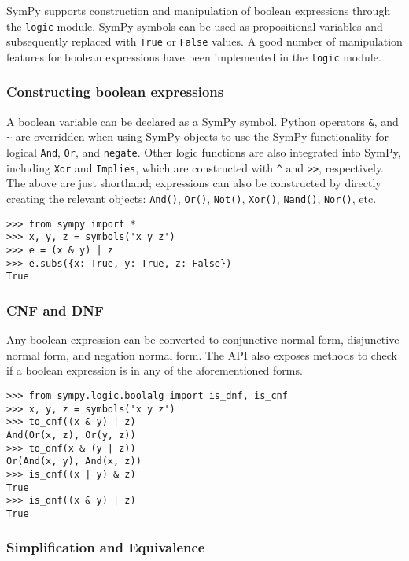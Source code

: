 
SymPy supports construction and manipulation of boolean expressions
through the \texttt{logic} module. SymPy symbols can be used as
propositional variables and subsequently replaced with \texttt{True}
or \texttt{False} values. A good number of manipulation features for boolean
expressions have been implemented in the \texttt{logic} module.

\subsubsection{Constructing boolean expressions}

A boolean variable can be declared as a SymPy symbol. Python operators
\texttt{\&}, \texttt{\textbar{}} and \texttt{\textasciitilde{}} are overridden
when using SymPy objects
to use the SymPy functionality for logical \texttt{And}, \texttt{Or}, and
\texttt{negate}.  Other logic functions are also integrated into SymPy,
including \texttt{Xor} and \texttt{Implies}, which are constructed with
\texttt{\^{}} and \texttt{\textgreater{}\textgreater{}}, respectively.  The above
are just shorthand; expressions can also be constructed by directly creating
the relevant objects: \verb|And()|, \verb|Or()|, \verb|Not()|, \verb|Xor()|,
\verb|Nand()|, \verb|Nor()|, etc.

\begin{verbatim}
>>> from sympy import *
>>> x, y, z = symbols('x y z')
>>> e = (x & y) | z
>>> e.subs({x: True, y: True, z: False})
True
\end{verbatim}

\subsubsection{CNF and DNF}

Any boolean expression can be converted to conjunctive normal form, disjunctive
normal form, and negation normal form. The API also exposes methods to check if
a boolean expression is in any of the aforementioned forms.

\begin{verbatim}
>>> from sympy.logic.boolalg import is_dnf, is_cnf
>>> x, y, z = symbols('x y z')
>>> to_cnf((x & y) | z)
And(Or(x, z), Or(y, z))
>>> to_dnf(x & (y | z))
Or(And(x, y), And(x, z))
>>> is_cnf((x | y) & z)
True
>>> is_dnf((x & y) | z)
True
\end{verbatim}

\subsubsection{Simplification and Equivalence}

